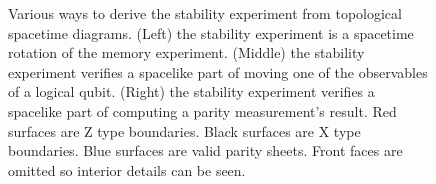 \documentclass[onecolumn,unpublished,a4paper]{quantumarticle}
\theoremstyle{definition}
\theoremstyle{definition}
\theoremstyle{definition}
\begin{document}
\begin{figure}
    \centering
    \caption{
        Various ways to derive the stability experiment from topological spacetime diagrams.
        (Left) the stability experiment is a spacetime rotation of the memory experiment.
        (Middle) the stability experiment verifies a spacelike part of moving one of the observables of a logical qubit.
        (Right) the stability experiment verifies a spacelike part of computing a parity measurement's result.
        Red surfaces are Z type boundaries.
        Black surfaces are X type boundaries.
        Blue surfaces are valid parity sheets.
        Front faces are omitted so interior details can be seen.
    }
    \label{fig:topological}
\end{figure}
\end{document}

